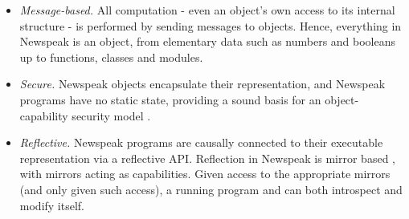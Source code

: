 \documentclass{article}
\begin{document}
\begin{itemize}
\item  {\em Message-based.}  All computation  - even an object's own access to its internal structure - is performed by sending messages to objects. Hence, everything in Newspeak is an object, from elementary data such as numbers and booleans up to functions, classes and modules.
\item  {\em Secure.} Newspeak objects encapsulate their representation, and Newspeak programs have no static state, providing a sound basis for an object-capability security model \cite{RobustComposition}.

\item  {\em Reflective.} Newspeak programs are causally connected to their executable representation via a reflective API. Reflection in Newspeak is mirror based \cite{bracha-ungar04}, with mirrors acting as capabilities.   Given access to the appropriate mirrors (and only given such access), a running program and can both introspect and modify itself. 


\end{itemize}
\end{document}
